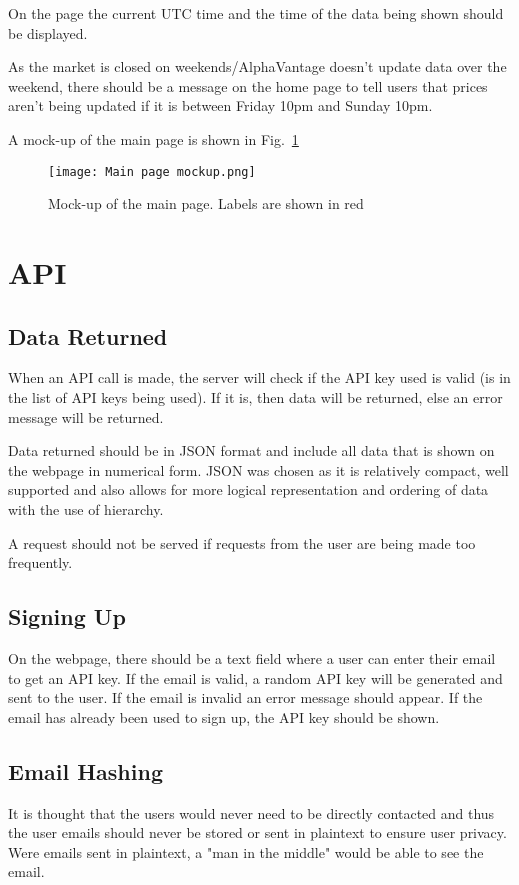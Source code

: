         On the page the current UTC time and the time of the data being shown should be displayed.

        As the market is closed on weekends/AlphaVantage doesn't update data over the weekend, there should be a message on the home page to tell users that prices aren't being updated if it is between Friday 10pm and Sunday 10pm.

        A mock-up of the main page is shown in Fig.~\ref{fig:main_page_mock} 

        \begin{figure}[h]
            \centering
            \texttt{[image: Main page mockup.png]}
            \caption{Mock-up of the main page. Labels are shown in red}
            \label{fig:main_page_mock}
        \end{figure}


    \section{API}
        
        \subsection{Data Returned}
        When an API call is made, the server will check if the API key used is valid (is in the list of API keys being used). If it is, then data will be returned, else an error message will be returned.

        Data returned should be in JSON format and include all data that is shown on the webpage in numerical form. JSON was chosen as it is relatively compact, well supported and also allows for more logical representation and ordering of data with the use of hierarchy. 

        A request should not be served if requests from the user are being made too frequently.
    

        \subsection{Signing Up}
        On the webpage, there should be a text field where a user can enter their email to get an API key. If the email is valid, a random API key will be generated and sent to the user. If the email is invalid an error message should appear. If the email has already been used to sign up, the API key should be shown.

        \subsection{Email Hashing}
        It is thought that the users would never need to be directly contacted and thus the user emails should never be stored or sent in plaintext to ensure user privacy. Were emails sent in plaintext, a "man in the middle" would be able to see the email.

